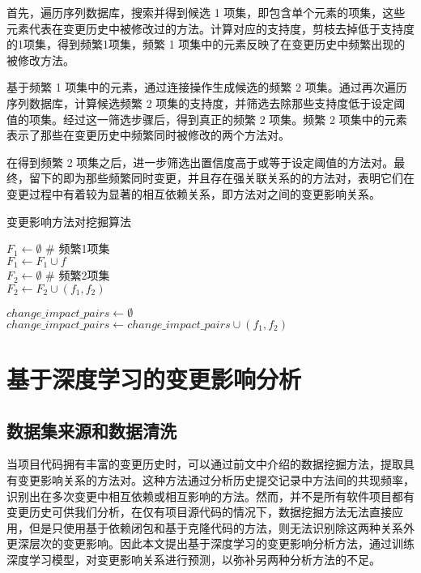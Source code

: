 首先，遍历序列数据库，搜索并得到候选 1 项集，即包含单个元素的项集，这些元素代表在变更历史中被修改过的方法。计算对应的支持度，剪枝去掉低于支持度的1项集，得到频繁1项集，频繁 1 项集中的元素反映了在变更历史中频繁出现的被修改方法。

基于频繁 1 项集中的元素，通过连接操作生成候选的频繁 2 项集。通过再次遍历序列数据库，计算候选频繁 2 项集的支持度，并筛选去除那些支持度低于设定阈值的项集。经过这一筛选步骤后，得到真正的频繁 2 项集。频繁 2 项集中的元素表示了那些在变更历史中频繁同时被修改的两个方法对。

在得到频繁 2 项集之后，进一步筛选出置信度高于或等于设定阈值的方法对。最终，留下的即为那些频繁同时变更，并且存在强关联关系的的方法对，表明它们在变更过程中有着较为显著的相互依赖关系，即方法对之间的变更影响关系。

\begin{algorithm}
\caption{变更影响方法对挖掘算法}
\begin{algorithmic}
\State $F_1 \gets \emptyset$  \# 频繁1项集\\  
 {
     {
        $F_1 \gets F_1 \cup f$
    }
} \\
\State $F_2 \gets \emptyset$  \# 频繁2项集\\ 
 {
     {
        $F_2 \gets F_2 \cup (f_1, f_2)$
    }
}

\State $change\_impact\_pairs \gets \emptyset$ \\ 
 {
     {
        $change\_impact\_pairs \gets change\_impact\_pairs \cup (f_1, f_2)$
    }
}
\end{algorithmic}
\end{algorithm}

\section{基于深度学习的变更影响分析}

\subsection{数据集来源和数据清洗}

当项目代码拥有丰富的变更历史时，可以通过前文中介绍的数据挖掘方法，提取具有变更影响关系的方法对。这种方法通过分析历史提交记录中方法间的共现频率，识别出在多次变更中相互依赖或相互影响的方法。然而，并不是所有软件项目都有变更历史可供我们分析，在仅有项目源代码的情况下，数据挖掘方法无法直接应用，但是只使用基于依赖闭包和基于克隆代码的方法，则无法识别除这两种关系外更深层次的变更影响。因此本文提出基于深度学习的变更影响分析方法，通过训练深度学习模型，对变更影响关系进行预测，以弥补另两种分析方法的不足。

